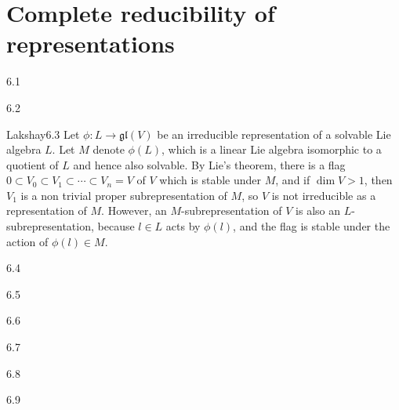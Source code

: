 \chapter{Complete reducibility of representations}

\begin{solution}{}{6.1}
    
\end{solution}

\begin{solution}{}{6.2}

\end{solution}

\begin{solution}{Lakshay}{6.3}
    Let $ \phi: L \to \mathfrak{gl}(V) $ be an irreducible representation of a solvable Lie algebra $ L $. Let $ M $ denote $ \phi(L) $, which is a linear Lie algebra isomorphic to a quotient of $ L $ and hence also solvable. By Lie's theorem, there is a flag $ 0 \subset V_{0} \subset V_{1} \subset \cdots \subset V_{n} = V $ of $ V $ which is stable under $ M $, and if $ \dim V > 1 $, then $ V_{1} $ is a non trivial proper subrepresentation of $ M $, so $ V $ is not irreducible as a representation of $ M $. However, an $ M $-subrepresentation of $ V $ is also an $ L $-subrepresentation, because $ l\in L $ acts by $ \phi(l) $, and the flag is stable under the action of $ \phi(l)\in M $.
\end{solution}

\begin{solution}{}{6.4}

\end{solution}

\begin{solution}{}{6.5}
    
\end{solution}

\begin{solution}{}{6.6}

\end{solution}

\begin{solution}{}{6.7}
    
\end{solution}

\begin{solution}{}{6.8}

\end{solution}

\begin{solution}{}{6.9}
    
\end{solution}